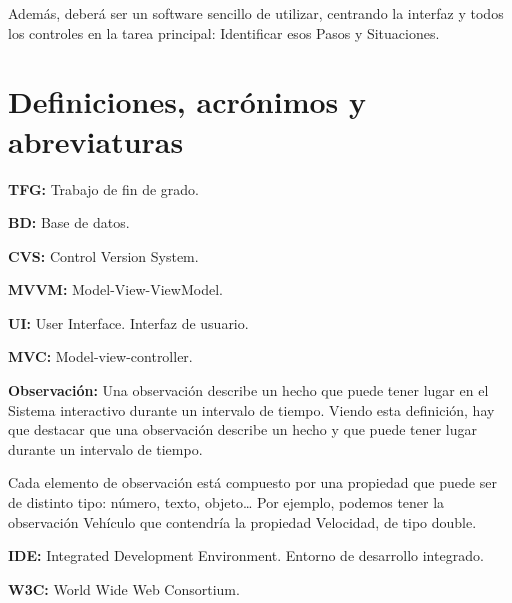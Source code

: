 Adem\'as, deber\'a ser un software sencillo de utilizar, centrando la interfaz y todos los controles en la tarea principal:
Identificar esos Pasos y Situaciones.

\section{Definiciones, acr\'{o}nimos y abreviaturas}
\textbf{TFG:} Trabajo de fin de grado.

\textbf{BD:} Base de datos.

\textbf{CVS:} Control Version System.

\textbf{MVVM:} Model-View-ViewModel.

\textbf{UI:} User Interface. Interfaz de usuario.

\textbf{MVC:} Model-view-controller.

\textbf{Observaci\'{o}n:} Una observación describe un hecho que puede tener lugar en el Sistema interactivo 
durante un intervalo de tiempo. Viendo esta definición, hay que destacar que una
observación describe un hecho y que puede tener lugar durante un intervalo de
tiempo.

Cada elemento de observación está compuesto por una propiedad que puede ser de
distinto tipo: número, texto, objeto… Por ejemplo, podemos tener la observación
Vehículo que contendría la propiedad Velocidad, de tipo double. \cite{INTRASIM:manual}

\textbf{IDE:} Integrated Development Environment. Entorno de desarrollo integrado.

\textbf{W3C:} World Wide Web Consortium.
 
